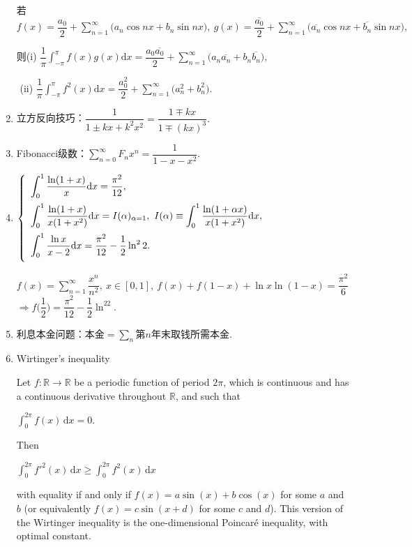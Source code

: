 \documentclass[UTF8]{ctexart}
\numberwithin{equation}{section}
\numberwithin{figure}{section}
\numberwithin{table}{section}
\newcommand\dif{\mathrm{d}}
\newcommand\dis{\displaystyle}
\newcommand\gs{\geqslant}
\newcommand\sumn{\dis\sum\limits_{n=1}^{\infty}}
\newcommand\sumnz{\dis\sum\limits_{n=0}^{\infty}}
\newcommand\intd{\dis\int}
\begin{document}
\begin{spacing}{2}
\begin{enumerate}[itemindent=1.4em, label=(\arabic*)]
若$\dis f(x)=\dfrac{a_0}{2}+\sumn\Big(a_n\cos nx+b_n\sin nx\Big),\ 
\dis g(x)=\dfrac{\overline{a_0}}{2}+\sumn\Big(\overline{a_n}\cos nx+\overline{b_n}\sin nx\Big),$

则(i) $\dis \dfrac{1}{\pi}\intd_{-\pi}^{\pi}f(x)g(x)\dif x=
\dfrac{a_0\overline{a_0}}{2}+\sumn\Big(a_n\overline{a_n}+b_n\overline{b_n}\Big),$

\quad\,\,(ii) $\dis \dfrac{1}{\pi}\intd_{-\pi}^{\pi}f^2(x)\dif x=
\dfrac{a_0^2}{2}+\sumn\Big(a_n^2+b_n^2\Big).$

\item 立方反向技巧：$\dis \dfrac{1}{1\pm kx+k^2x^2}=\dfrac{1\mp kx}{1\mp(kx)^3}.$

\item Fibonacci级数：$\sumnz F_nx^n=\dfrac{1}{1-x-x^2}.$

\item $\left\{\begin{array}{l}
\intd_0^1\dfrac{\ln(1+x)}{x}\dif x=\dfrac{\pi^2}{12},\vspace{0.2cm}\\
\intd_0^1\dfrac{\ln(1+x)}{x(1+x^2)}\dif x=I(\alpha)_{\alpha=1},\ I(\alpha)\equiv\intd_0^1\dfrac{\ln(1+\alpha x)}{x(1+x^2)}\dif x,\vspace{0.2cm}\\
\intd_0^1\dfrac{\ln x}{x-2}\dif x=\dfrac{\pi^2}{12}-\dfrac{1}{2}\ln^22.\vspace{0.2cm}\\
\end{array}\right.$

$f(x)=\sumn\dfrac{x^n}{n^2},\ x\in[0,1],\ f(x)+f(1-x)+\ln x\ln(1-x)=\dfrac{\pi^2}{6}$
$\Longrightarrow f\bigg(\dfrac{1}{2}\bigg)=\dfrac{\pi^2}{12}-\dfrac{1}{2}\ln^22.$

\item 利息本金问题：$\text{本金}=\dis\sum\limits_n\text{第}n\text{年末取钱所需本金}.$

\item \textcolor[rgb]{1,0,0}{Wirtinger's inequality}

Let $\displaystyle f:\mathbb {R} \to \mathbb {R} $ be a periodic function of period $2\pi$, which is continuous and has a continuous derivative throughout $\mathbb{R}$, and such that

\centerline{\textcolor[rgb]{0,0,1}{${\displaystyle \int _{0}^{2\pi }f(x)\,\dif x=0.} $}}
Then

\centerline{\textcolor[rgb]{0,0,1}{${\displaystyle \int _{0}^{2\pi }f'^{2}(x)\,\dif x\gs \int _{0}^{2\pi }f^{2}(x)\,\dif x} $}}
with equality if and only if $f(x) = a \sin(x) + b \cos(x)$ for some $a$ and $b$ (or equivalently $f(x) = c \sin (x + d)$ for some $c$ and $d$). This version of the Wirtinger inequality is the one-dimensional Poincaré inequality, with optimal constant.


\end{enumerate}
\end{spacing}
\end{document}
